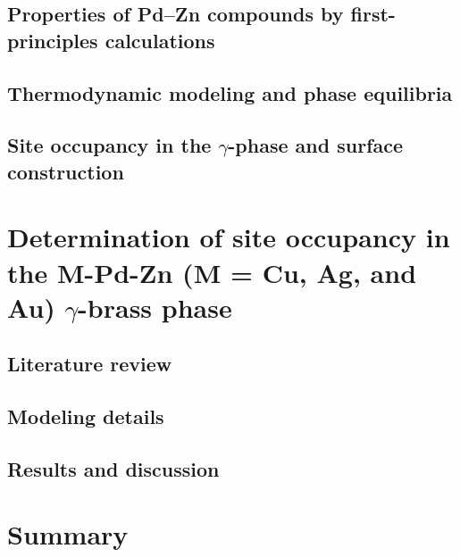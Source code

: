 \subsection{Properties of Pd–Zn compounds by first-principles calculations} \label{intermetallics:ssec:PdZndft}

\subsection{Thermodynamic modeling and phase equilibria} \label{intermetallics:ssec:PdZneq}


\subsection{Site occupancy in the \texorpdfstring{$\gamma$}--phase and surface construction} \label{intermetallics:ssec:PdZnsite}


\section{Determination of site occupancy in the M-Pd-Zn (M = Cu, Ag, and Au) \texorpdfstring{$\gamma$}--brass phase} \label{intermetallics:sec:PdZnM}

\subsection{Literature review} \label{intermetallics:ssec:PdZnMlit}


\subsection{Modeling details} \label{intermetallics:ssec:PdZnMmodel}


\subsection{Results and discussion} \label{intermetallics:ssec:PdZnMresult}


\section{Summary} \label{intermetallics:sec:Summary}
